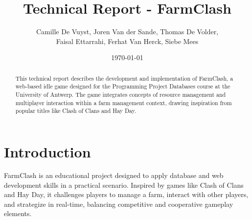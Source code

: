 \documentclass[12pt]{article}
\title{Technical Report - FarmClash}
\author{Camille De Vuyst, Joren Van der Sande, Thomas De Volder,\\ Faisal Ettarrahi, Ferhat Van Herck, Siebe Mees}
\date{\today}
\begin{document}
\maketitle
\tableofcontents
\newpage

\begin{abstract}
This technical report describes the development and implementation of FarmClash, a web-based idle game designed for the Programming Project Databases course at the University of Antwerp. The game integrates concepts of resource management and multiplayer interaction within a farm management context, drawing inspiration from popular titles like Clash of Clans and Hay Day.
\end{abstract}

\section{Introduction}
FarmClash is an educational project designed to apply database and web development skills in a practical scenario. Inspired by games like Clash of Clans and Hay Day, it challenges players to manage a farm, interact with other players, and strategize in real-time, balancing competitive and cooperative gameplay elements.
\end{document}
